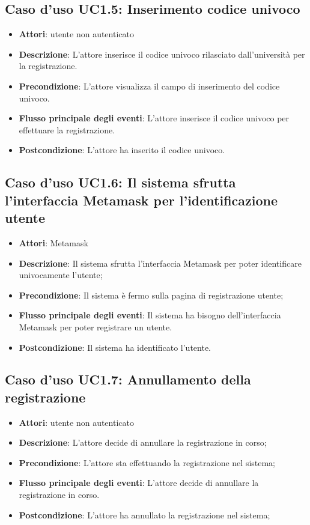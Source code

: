 \subsection{Caso d'uso \texorpdfstring{UC1.5}{UC1.5}: Inserimento codice univoco}
\begin{itemize}
\item \textbf{Attori}: utente non autenticato
\item \textbf{Descrizione}: L'attore inserisce il codice univoco rilasciato dall'università per la registrazione.
\item \textbf{Precondizione}: L'attore visualizza il campo di inserimento del codice univoco.
\item \textbf{Flusso principale degli eventi}: L'attore inserisce il codice univoco per effettuare la registrazione.
\item \textbf{Postcondizione}: L'attore ha inserito il codice univoco.
\end{itemize}
\subsection{Caso d'uso \texorpdfstring{UC1.6}{UC1.6}: Il sistema sfrutta l'interfaccia Metamask per l'identificazione utente}
\begin{itemize}
\item \textbf{Attori}: Metamask
\item \textbf{Descrizione}: Il sistema sfrutta l'interfaccia Metamask per poter identificare univocamente l'utente;
\item \textbf{Precondizione}: Il sistema è fermo sulla pagina di registrazione utente;
\item \textbf{Flusso principale degli eventi}: Il sistema ha bisogno dell'interfaccia Metamask per poter registrare un utente.
\item \textbf{Postcondizione}: Il sistema ha identificato l'utente.
\end{itemize}
\subsection{Caso d'uso \texorpdfstring{UC1.7}{UC1.7}: Annullamento della registrazione}
\begin{itemize}
\item \textbf{Attori}: utente non autenticato
\item \textbf{Descrizione}: L'attore decide di annullare la registrazione in corso;
\item \textbf{Precondizione}: L'attore sta effettuando la registrazione nel sistema;
\item \textbf{Flusso principale degli eventi}: L'attore decide di annullare la registrazione in corso.
\item \textbf{Postcondizione}: L'attore ha annullato la registrazione nel sistema;
\end{itemize}
